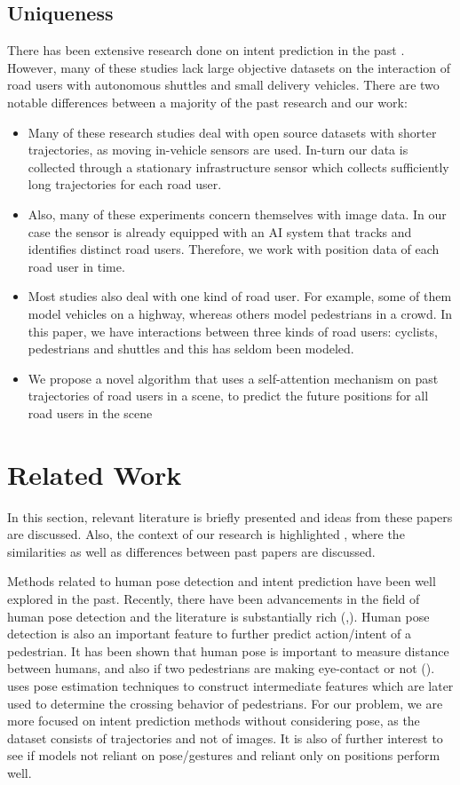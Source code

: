 \documentclass{article}
\begin{document}
\subsection{Uniqueness}
There has been extensive research done on intent prediction in the past \cite{razali_pedestrian_2021}\cite{saleh_early_2017}\cite{alahi_social_2016}\cite{saleh_long-term_2018} . However, many of these studies lack large objective datasets on the interaction of road users with autonomous shuttles and small delivery vehicles. There are two notable differences between a majority of the past research and our work:
\begin{itemize}
    \item Many of these research studies deal with open source datasets with shorter trajectories, as moving in-vehicle sensors are used. In-turn our data is collected through a stationary infrastructure sensor which collects sufficiently long trajectories for each road user. 
    \item Also, many of these experiments concern themselves with image data. In our case the sensor is already equipped with an AI system that tracks and identifies distinct road users. Therefore, we work with position data of each road user in time. 
    \item Most studies also deal with one kind of road user. For example, some of them  model vehicles on a highway, whereas others model pedestrians in a crowd. In this paper, we have interactions between three kinds of road users: cyclists, pedestrians and shuttles and this has seldom been modeled.
    \item We propose a novel algorithm that uses a self-attention mechanism on past trajectories of road users in a scene, to predict the future positions for all road users in the scene
\end{itemize}

\section{Related Work}
In this section, relevant literature is briefly presented and ideas from these papers are discussed. Also, the context of our research is highlighted , where the similarities as well as differences between past papers are discussed.

Methods related to human pose detection and intent prediction have been well explored in the past. Recently, there have been advancements in the field of human pose detection and the literature is substantially rich (\cite{he_mask_2018},\cite{fang_rmpe_2018}). Human pose detection is also an important feature to further predict action/intent of a pedestrian. It has been shown that human pose is important to measure distance between humans, and also if two pedestrians are making eye-contact or not (\cite{bertoni_perceiving_2021}). \cite{razali_pedestrian_2021} uses pose estimation techniques to construct intermediate features which are later used to determine the crossing behavior of pedestrians. For our problem, we are more focused on intent prediction methods without considering pose, as the dataset consists of trajectories and not of images. It is also of further interest to see if models not reliant on pose/gestures and reliant only on positions perform well.
\end{document}
